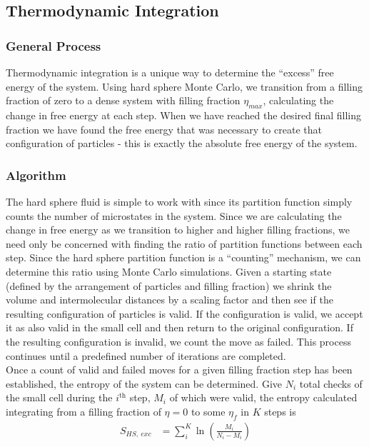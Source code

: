 \documentclass[12pt]{article}
\begin{document}


\subsection{Thermodynamic Integration}
\subsubsection{General Process}
Thermodynamic integration is a unique way to determine the ``excess'' free energy of the system. Using hard sphere Monte Carlo, we transition from a filling fraction of zero to a dense system with filling fraction $\eta_{max}$, calculating the change in free energy at each step. When we have reached the desired final filling fraction we have found the free energy that was necessary to create that configuration of particles - this is exactly the absolute free energy of the system.\\
\subsubsection{Algorithm}
The hard sphere fluid is simple to work with since its partition function simply counts the number of microstates in the system\cite{valeskethesis}. Since we are calculating the change in free energy as we transition to higher and higher filling fractions, we need only be concerned with finding the ratio of partition functions between each step. Since the hard sphere partition function is a ``counting'' mechanism, we can determine this ratio using Monte Carlo simulations. Given a starting state (defined by the arrangement of particles and filling fraction) we shrink the volume and intermolecular distances by a scaling factor and then see if the resulting configuration of particles is valid. If the configuration is valid, we accept it as also valid in the small cell and then return to the original configuration. If the resulting configuration is invalid, we count the move as failed. This process continues until a predefined number of iterations are completed.\\


Once a count of valid and failed moves for a given filling fraction step has been established, the entropy of the system can be determined. Give $N_i$ total checks of the small cell during the $i^{\text{th}}$ step, $M_i$ of which were valid, the entropy calculated integrating from a filling fraction of $\eta=0$ to some $\eta_f$ in $K$ steps is
\begin{align}
    S_{HS,~exc} &= \sum_i^K \ln\left(\frac{M_i}{N_i-M_i}\right)
\end{align}
\end{document}

